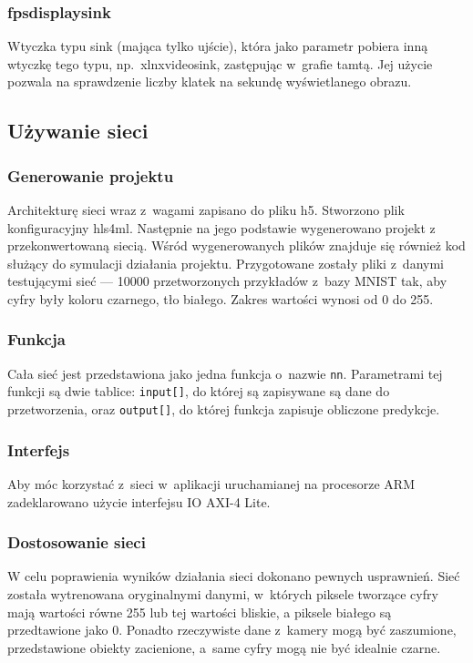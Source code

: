 \documentclass[12pt, oneside, a4paper]{article}
\begin{document}
\subsubsection{fpsdisplaysink}\label{sec:fpsdisplaysink}
Wtyczka typu sink (mająca tylko ujście), która jako parametr
pobiera inną wtyczkę tego typu, np.~xlnxvideosink,
zastępując w~grafie tamtą.
Jej użycie pozwala na sprawdzenie liczby klatek na sekundę
wyświetlanego obrazu.


\subsection{Używanie sieci}\label{sec:Uzywanie sieci}
\subsubsection{Generowanie projektu}\label{sec:Generowanie projektu}
Architekturę sieci wraz z~wagami zapisano do pliku h5. Stworzono
plik konfiguracyjny hls4ml. Następnie na jego podstawie wygenerowano projekt
z przekonwertowaną siecią. Wśród wygenerowanych plików znajduje się
również kod służący do symulacji działania projektu. Przygotowane zostały
pliki z~danymi testującymi sieć --- 10000 przetworzonych przykładów z~bazy
MNIST tak, aby cyfry były koloru czarnego, tło białego. Zakres wartości
wynosi od 0 do 255.

\subsubsection{Funkcja}\label{section:funkcja}
Cała sieć jest przedstawiona jako jedna funkcja o~nazwie \lstinline{nn}.
Parametrami tej funkcji są dwie tablice:
\lstinline[style=hls]{input[]}, do której są zapisywane są
dane do przetworzenia,
oraz \lstinline[style=hls]{output[]}, do której funkcja zapisuje
obliczone predykcje.

\begin{minipage}{\linewidth}

\end{minipage}

\subsubsection{Interfejs}\label{sec:Interfejs}
Aby móc korzystać z~sieci w~aplikacji uruchamianej na procesorze ARM
zadeklarowano użycie interfejsu IO \mbox{AXI-4} Lite.

\subsubsection{Dostosowanie sieci}\label{sec:Dostosowanie sieci}
W celu poprawienia wyników działania sieci dokonano pewnych usprawnień.
Sieć została wytrenowana oryginalnymi danymi, w~których piksele tworzące
cyfry mają wartości równe 255 lub tej wartości bliskie,
a piksele białego są przedtawione jako 0.
Ponadto rzeczywiste dane z~kamery mogą być zaszumione,
przedstawione obiekty zacienione, a~same cyfry mogą nie być idealnie czarne.
\end{document}
